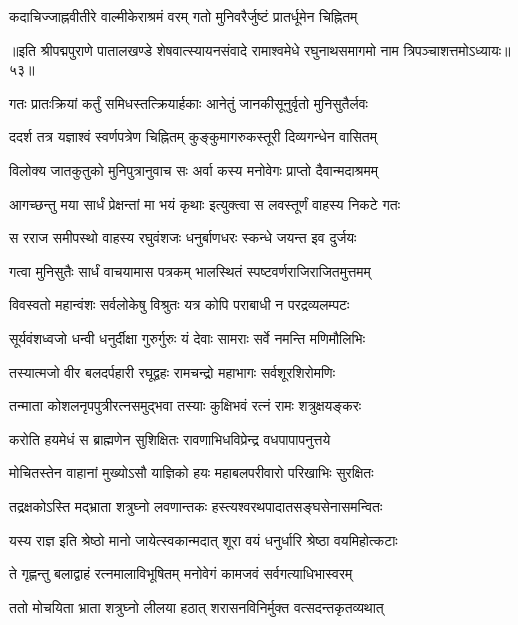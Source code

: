 \twolineshloka
{कदाचिज्जाह्नवीतीरे वाल्मीकेराश्रमं वरम्}
{गतो मुनिवरैर्जुष्टं प्रातर्धूमेन चिह्नितम्}%

॥इति श्रीपद्मपुराणे पातालखण्डे शेषवात्स्यायनसंवादे रामाश्वमेधे रघुनाथसमागमो नाम त्रिपञ्चाशत्तमोऽध्यायः॥५३॥



\twolineshloka
{गतः प्रातःक्रियां कर्तुं समिधस्तत्क्रियार्हकाः}
{आनेतुं जानकीसूनुर्वृतो मुनिसुतैर्लवः}%

\twolineshloka
{ददर्श तत्र यज्ञाश्वं स्वर्णपत्रेण चिह्नितम्}
{कुङ्कुमागरुकस्तूरी दिव्यगन्धेन वासितम्}%

\twolineshloka
{विलोक्य जातकुतुको मुनिपुत्रानुवाच सः}
{अर्वा कस्य मनोवेगः प्राप्तो दैवान्मदाश्रमम्}%

\twolineshloka
{आगच्छन्तु मया सार्धं प्रेक्षन्तां मा भयं कृथाः}
{इत्युक्त्वा स लवस्तूर्णं वाहस्य निकटे गतः}%

\twolineshloka
{स रराज समीपस्थो वाहस्य रघुवंशजः}
{धनुर्बाणधरः स्कन्धे जयन्त इव दुर्जयः}%

\twolineshloka
{गत्वा मुनिसुतैः सार्धं वाचयामास पत्रकम्}
{भालस्थितं स्पष्टवर्णराजिराजितमुत्तमम्}%

\twolineshloka
{विवस्वतो महान्वंशः सर्वलोकेषु विश्रुतः}
{यत्र कोपि पराबाधी न परद्रव्यलम्पटः}%

\twolineshloka
{सूर्यवंशध्वजो धन्वी धनुर्दीक्षा गुरुर्गुरुः}
{यं देवाः सामराः सर्वे नमन्ति मणिमौलिभिः}%

\twolineshloka
{तस्यात्मजो वीर बलदर्पहारी रघूद्वहः}
{रामचन्द्रो महाभागः सर्वशूरशिरोमणिः}%

\twolineshloka
{तन्माता कोशलनृपपुत्रीरत्नसमुद्भवा}
{तस्याः कुक्षिभवं रत्नं रामः शत्रुक्षयङ्करः}%

\twolineshloka
{करोति हयमेधं स ब्राह्मणेन सुशिक्षितः}
{रावणाभिधविप्रेन्द्र वधपापापनुत्तये}%

\twolineshloka
{मोचितस्तेन वाहानां मुख्योऽसौ याज्ञिको हयः}
{महाबलपरीवारो परिखाभिः सुरक्षितः}%

\twolineshloka
{तद्रक्षकोऽस्ति मद्भ्राता शत्रुघ्नो लवणान्तकः}
{हस्त्यश्वरथपादातसङ्घसेनासमन्वितः}%

\twolineshloka
{यस्य राज्ञ इति श्रेष्ठो मानो जायेत्स्वकान्मदात्}
{शूरा वयं धनुर्धारि श्रेष्ठा वयमिहोत्कटाः}%

\twolineshloka
{ते गृह्णन्तु बलाद्वाहं रत्नमालाविभूषितम्}
{मनोवेगं कामजवं सर्वगत्याधिभास्वरम्}%

\twolineshloka
{ततो मोचयिता भ्राता शत्रुघ्नो लीलया हठात्}
{शरासनविनिर्मुक्त वत्सदन्तकृतव्यथात्}%

